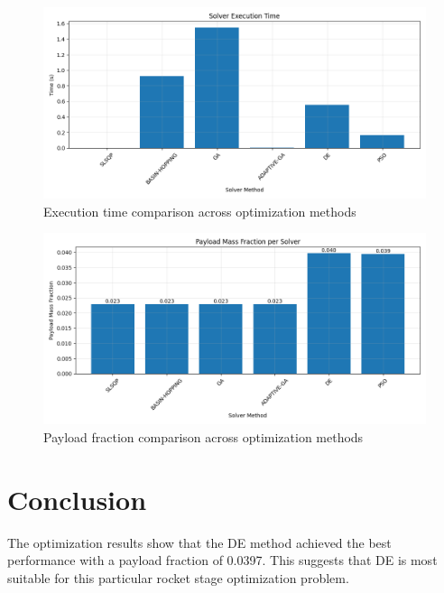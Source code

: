 \documentclass{article}
\begin{document}
\begin{figure}[H]
\centering
\includegraphics[width=\textwidth]{execution_time.png}
\caption{Execution time comparison across optimization methods}
\label{fig:execution-time}
\end{figure}

\begin{figure}[H]
\centering
\includegraphics[width=\textwidth]{payload_fraction.png}
\caption{Payload fraction comparison across optimization methods}
\label{fig:payload-fraction}
\end{figure}

\section{Conclusion}
The optimization results show that the DE method achieved the best performance with a payload fraction of 0.0397. This suggests that DE is most suitable for this particular rocket stage optimization problem.
\end{document}

